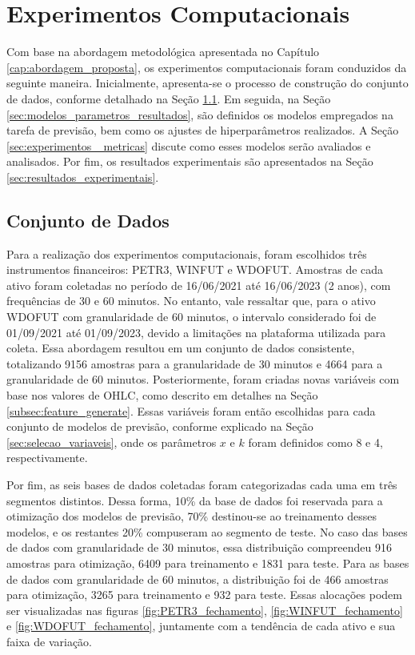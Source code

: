 \chapter{Experimentos Computacionais}
\label{cap:experimentos}
Com base na abordagem metodológica apresentada no Capítulo \ref{cap:abordagem_proposta}, os experimentos computacionais foram conduzidos da seguinte maneira. Inicialmente, apresenta-se o processo de construção do conjunto de dados, conforme detalhado na Seção \ref{sec:conjunto_dados_resultados}. Em seguida, na Seção \ref{sec:modelos_parametros_resultados}, são definidos os modelos empregados na tarefa de previsão, bem como os ajustes de hiperparâmetros realizados. A Seção \ref{sec:experimentos _metricas} discute como esses modelos serão avaliados e analisados. Por fim, os resultados experimentais são apresentados na Seção \ref{sec:resultados_experimentais}.


\section{Conjunto de Dados}
\label{sec:conjunto_dados_resultados}
Para a realização dos experimentos computacionais, foram escolhidos três instrumentos financeiros: PETR3, WINFUT e WDOFUT. Amostras de cada ativo foram coletadas no período de 16/06/2021 até 16/06/2023 (2 anos), com frequências de 30 e 60 minutos. No entanto, vale ressaltar que, para o ativo WDOFUT com granularidade de 60 minutos, o intervalo considerado foi de 01/09/2021 até 01/09/2023, devido a limitações na plataforma utilizada para coleta. Essa abordagem resultou em um conjunto de dados consistente, totalizando 9156 amostras para a granularidade de 30 minutos e 4664 para a granularidade de 60 minutos. 
Posteriormente, foram criadas novas variáveis com base nos valores de \ac{OHLC}, como descrito em detalhes na Seção \ref{subsec:feature_generate}. Essas variáveis foram então escolhidas para cada conjunto de modelos de previsão, conforme explicado na Seção \ref{sec:selecao_variaveis}, onde os parâmetros $x$ e $k$ foram definidos como 8 e 4, respectivamente.

Por fim, as seis bases de dados coletadas foram categorizadas cada uma em três segmentos distintos. Dessa forma, 10\% da base de dados foi reservada para a otimização dos modelos de previsão, 70\% destinou-se ao treinamento desses modelos, e os restantes 20\% compuseram ao segmento de teste. No caso das bases de dados com granularidade de 30 minutos, essa distribuição compreendeu 916 amostras para otimização, 6409 para treinamento e 1831 para teste. Para as bases de dados com granularidade de 60 minutos, a distribuição foi de 466 amostras para otimização, 3265 para treinamento e 932 para teste. Essas alocações podem ser visualizadas nas figuras \ref{fig:PETR3_fechamento}, \ref{fig:WINFUT_fechamento} e \ref{fig:WDOFUT_fechamento}, juntamente com a tendência de cada ativo e sua faixa de variação.

